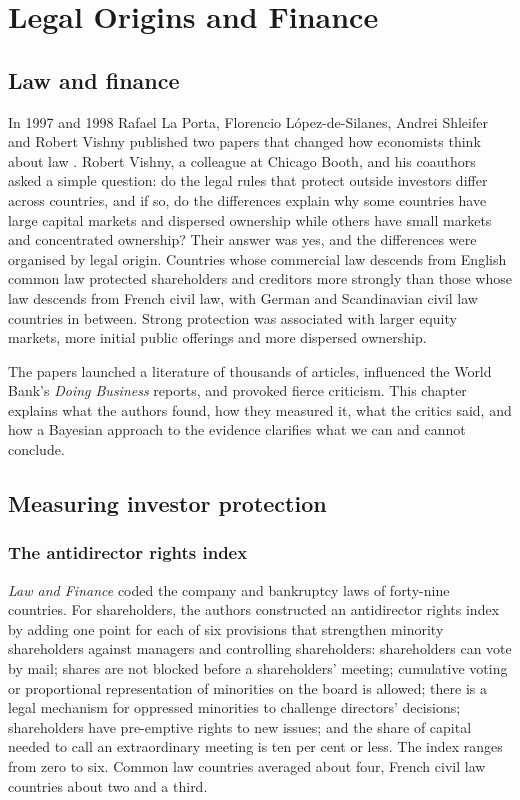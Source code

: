 \chapter{Legal Origins and Finance}
\label{ch:llsv}

\section{Law and finance}

In 1997 and 1998 Rafael La Porta, Florencio L\'opez-de-Silanes, Andrei Shleifer and Robert Vishny published two papers that changed how economists think about law \citep{llsv1997,llsv1998}. Robert Vishny, a colleague at Chicago Booth, and his coauthors asked a simple question: do the legal rules that protect outside investors differ across countries, and if so, do the differences explain why some countries have large capital markets and dispersed ownership while others have small markets and concentrated ownership? Their answer was yes, and the differences were organised by legal origin. Countries whose commercial law descends from English common law protected shareholders and creditors more strongly than those whose law descends from French civil law, with German and Scandinavian civil law countries in between. Strong protection was associated with larger equity markets, more initial public offerings and more dispersed ownership.

The papers launched a literature of thousands of articles, influenced the World Bank's \emph{Doing Business} reports, and provoked fierce criticism. This chapter explains what the authors found, how they measured it, what the critics said, and how a Bayesian approach to the evidence clarifies what we can and cannot conclude.

\section{Measuring investor protection}

\subsection{The antidirector rights index}

\emph{Law and Finance} coded the company and bankruptcy laws of forty-nine countries. For shareholders, the authors constructed an antidirector rights index by adding one point for each of six provisions that strengthen minority shareholders against managers and controlling shareholders: shareholders can vote by mail; shares are not blocked before a shareholders' meeting; cumulative voting or proportional representation of minorities on the board is allowed; there is a legal mechanism for oppressed minorities to challenge directors' decisions; shareholders have pre-emptive rights to new issues; and the share of capital needed to call an extraordinary meeting is ten per cent or less. The index ranges from zero to six. Common law countries averaged about four, French civil law countries about two and a third.

